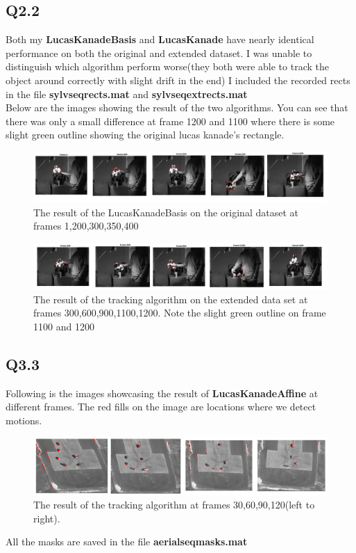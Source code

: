 \documentclass{article}
\begin{document}
\subsection*{Q2.2}
Both my \textbf{LucasKanadeBasis} and \textbf{LucasKanade} have nearly identical performance on both the original and extended dataset. I was unable to distinguish which algorithm perform worse(they both were able to track the object around correctly with slight drift in the end) I included the recorded rects in the file \textbf{sylvseqrects.mat} and \textbf{sylvseqextrects.mat}\\
Below are the images showing the result of the two algorithms. You can see that there was only a small difference at frame 1200 and 1100 where there is some slight green outline showing the original lucas kanade's rectangle.
\begin{figure}[H]
    \centering
    \includegraphics[width=6.5in]{./figures/p2}
    \caption{The result of the LucasKanadeBasis on the original dataset at frames 1,200,300,350,400}
\end{figure}
\begin{figure}[H]
    \centering
    \includegraphics[width=6.5in]{./figures/p2-ext}
    \caption{The result of the tracking algorithm on the extended data set at frames 300,600,900,1100,1200. Note the slight green outline on frame 1100 and 1200}
\end{figure}
\subsection*{Q3.3}
Following is the images showcasing the result of \textbf{LucasKanadeAffine} at different frames. The red fills on the image are locations where we detect motions. 
\begin{figure}[H]
    \centering
    \includegraphics[width=6.5in]{./figures/p3}
    \caption{The result of the tracking algorithm at frames 30,60,90,120(left to right).}
\end{figure}
All the masks are saved in the file \textbf{aerialseqmasks.mat}
\end{document}
